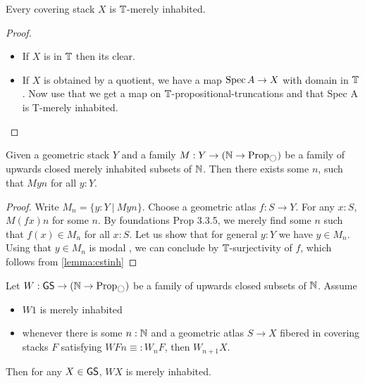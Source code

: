 \begin{lemma}{\label{lemma:cstinh}}
	Every covering stack $X$ is $\mathbb{T}$-merely inhabited.
\end{lemma}
\begin{proof} 
	\begin{itemize}
		\item If $X$ is in $\mathbb{T}$ then its clear.
		\item  If $X$ is obtained by a quotient, we have a map $\operatorname{Spec} A \to X$ with domain in $\mathbb{T}$. Now use that we get a map on $\mathbb{T}$-propositional-truncations and that Spec A is T-merely inhabited.
	\end{itemize}
\end{proof}
\begin{prop}{\label{prop:FindCommonN}}
	Given a geometric stack $Y$ and a family $M : Y \to (\bN \to \Prop_{\ci})$  be a family of upwards closed merely inhabited subsets of $\mathbb{N}$. Then there exists some $n$, such that $M y n$ for all $y : Y$.
\end{prop}
\begin{proof}
	Write $M_n = \{y : Y \ | \ M y n\}$.
	Choose a geometric atlas $f : S \to Y$.
	For any $x : S$, $M(f x) n$ for some $n$. By foundations Prop 3.3.5, we merely find some $n$ such that $f(x) \in M_n$ for all $x : S$. Let us show that for general $y : Y$ we have $y \in M_n$. Using that $y \in M_n$ is modal , we can conclude by $\mathbb{T}$-surjectivity of $f$, which follows from \ref{lemma:cstinh}
	
\end{proof}
\begin{prop}{\label{prop:OneToRuleThemAll}}
	Let $W : \GS \to (\bN \to \Prop_{\ci})$ be a family of upwards closed subsets of $\mathbb{N}$. Assume
	\begin{itemize}
		\item $W 1$ is merely inhabited
		\item whenever there is some $n : \mathbb{N}$ and a geometric atlas $S \to X$ fibered in covering stacks $F$ satisfying $W F n \equiv: W_n F$, then $W_{n+1} X$.
	\end{itemize}  %
	Then for any $X \in \mathsf{GS}$, $W X$ is merely inhabited.
\end{prop}

